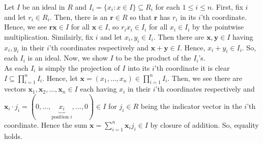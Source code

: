 \documentclass[a4paper]{article}
\begin{document}
\begin{problem}[4]
Let \(I\) be an ideal in \(R\) and \(I_i = \{x_i :  x\in I\} \subseteq R_i\) for each \(1 \le i \le n\). First, fix \(i\) and let \(r_{i} \in R_i\). Then, there is an \(\textbf{r}\in R\) so that \(\textbf{r}\) has \(r_{i}\) in its \(i\)'th coordinate. Hence, we see \(\textbf{r}\textbf{x} \in I\) for all \(\textbf{x} \in I\), so \(r_ix_i \in I_i\) for all \(x_i \in I_i\) by the pointwise multiplication. Similairly, fix \(i\) and let \(x_{i}, y_{i} \in I_{i}\). Then there are \(\textbf{x}, \textbf{y} \in I\) having \(x_{i}, y_{i}\) in their \(i\)'th coordinates respectively and \(\textbf{x} + \textbf{y}\in I\). Hence, \(x_{i} + y_{i} \in I_{i}\). So, each \(I_{i}\) is an ideal. Now, we show \(I\) to be the product of the \(I_{i}\)'s.\\
As each \(I_{i}\) is simply the projection of \(I\) into its \(i\)'th coordinate it is clear \(I \subseteq \prod_{i= 1}^{n} I_{i} \). Hence, let \(\textbf{x} = \left( x_1, \ldots, x_{n} \right) \in \prod_{i= 1}^{n} I_{i} \). Then, we see there are vectors \(\textbf{x}_1, \textbf{x}_2, \ldots, \textbf{x}_{n} \in I\) each having \(x_{i}\) in their \(i\)'th coordinates respectively and \(\textbf{x}_i \cdot j_{i} = \left( 0, \ldots, \underbrace{x_{i}}_{\text{position } i}, \ldots, 0  \right)  \in I \) for \(j_{i} \in R\) being the indicator vector in the \(i\)'th coordinate. Hence the sum \(\textbf{x} = \sum_{i= 1}^{n} \textbf{x}_{i} j_{i} \in I\) by closure of addition. So, equality holds.
\end{problem}
\newpage
\end{document}

